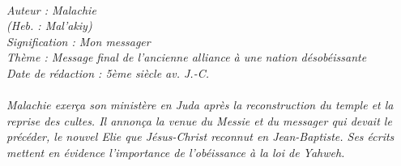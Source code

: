 \BFont
\noindent\hrulefill
{\footnotesize
\textit{
\bigskip
{\centering{}
\\Auteur : Malachie
\\(Heb. : Mal'akiy)
\\Signification : Mon messager
\\Thème : Message final de l'ancienne alliance à une nation désobéissante
\\Date de rédaction : 5ème siècle av. J.-C.\\}
}
\textit{
\\Malachie exerça son ministère en Juda après la reconstruction du temple et la reprise des cultes. Il annonça la venue du Messie et du messager qui devait le précéder, le nouvel Elie que Jésus-Christ reconnut en Jean-Baptiste. Ses écrits mettent en évidence l’importance de l’obéissance à la loi de Yahweh.\bigskip
}
}
\par\nobreak\noindent\hrulefill
